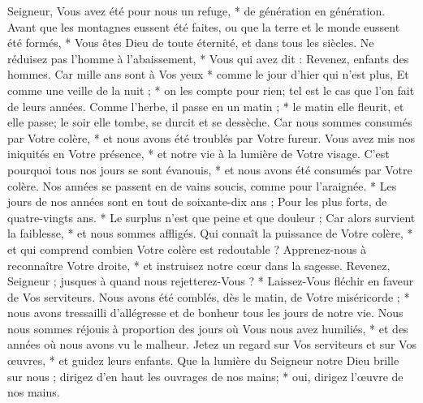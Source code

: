  Seigneur, Vous avez été pour nous un refuge, * de génération en génération.
\versseparator
 Avant que les montagnes eussent été faites, ou que la terre et le monde eussent été formés, * Vous êtes Dieu de toute éternité, et dans tous les siècles.
\versseparator
 Ne réduisez pas l'homme à l'abaissement, * Vous qui avez dit : Revenez, enfants des hommes.
\versseparator
 Car mille ans sont à Vos yeux * comme le jour d'hier qui n'est plus,
\versseparator
 Et comme une veille de la nuit ; * on les compte pour rien; tel est le cas que l'on fait de leurs années.
\versseparator
 Comme l'herbe, il passe en un matin ; * le matin elle fleurit, et elle passe; le soir elle tombe, se durcit et se dessèche.
\versseparator
 Car nous sommes consumés par Votre colère, * et nous avons été troublés par Votre fureur.
\versseparator
 Vous avez mis nos iniquités en Votre présence, * et notre vie à la lumière de Votre visage.
\versseparator
 C'est pourquoi tous nos jours se sont évanouis, * et nous avons été consumés par Votre colère.
\versseparator
 Nos années se passent en de vains soucis, comme pour l'araignée. * Les jours de nos années sont en tout de soixante-dix ans ;
\versseparator
 Pour les plus forts, de quatre-vingts ans. * Le surplus n'est que peine et que douleur ;
\versseparator
 Car alors survient la faiblesse, * et nous sommes affligés.
\versseparator
 Qui connaît la puissance de Votre colère, * et qui comprend combien Votre colère est redoutable ?
\versseparator
 Apprenez-nous à reconnaître Votre droite, * et instruisez notre cœur dans la sagesse.
\versseparator
 Revenez, Seigneur ; jusques à quand nous rejetterez-Vous ? * Laissez-Vous fléchir en faveur de Vos serviteurs.
\versseparator
 Nous avons été comblés, dès le matin, de Votre miséricorde ; * nous avons tressailli d'allégresse et de bonheur tous les jours de notre vie.
\versseparator
 Nous nous sommes réjouis à proportion des jours où Vous nous avez humiliés, * et des années où nous avons vu le malheur.
\versseparator
 Jetez un regard sur Vos serviteurs et sur Vos œuvres, * et guidez leurs enfants.
\versseparator
 Que la lumière du Seigneur notre Dieu brille sur nous ; dirigez d'en haut les ouvrages de nos mains; * oui, dirigez l'œuvre de nos mains.